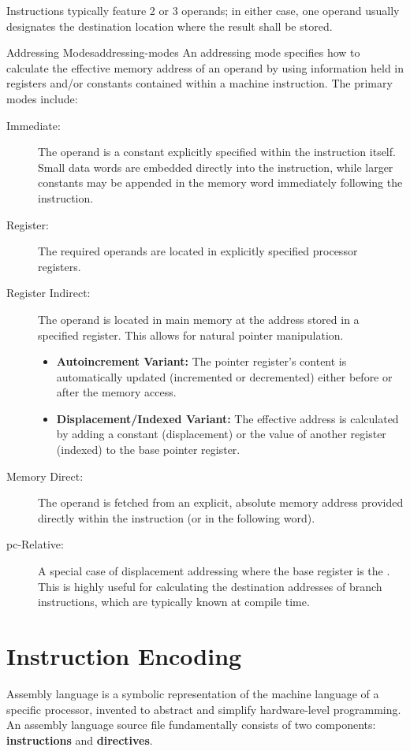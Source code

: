 \noindent Instructions typically feature 2 or 3 operands; in either case, one operand usually designates the destination location where the result shall be stored.

\begin{definition}{Addressing Modes}{addressing-modes}
    An addressing mode specifies how to calculate the effective memory address of an operand by using information held in registers and/or constants contained within a machine instruction. The primary modes include:
    \begin{description}
        \item[Immediate:] The operand is a constant explicitly specified within the instruction itself. Small data words are embedded directly into the instruction, while larger constants may be appended in the memory word immediately following the instruction.
        \item[Register:] The required operands are located in explicitly specified processor registers.
        \item[Register Indirect:] The operand is located in main memory at the address stored in a specified register. This allows for natural pointer manipulation.
        \begin{itemize}
            \item \textbf{Autoincrement Variant:} The pointer register's content is automatically updated (incremented or decremented) either before or after the memory access.
            \item \textbf{Displacement/Indexed Variant:} The effective address is calculated by adding a constant (displacement) or the value of another register (indexed) to the base pointer register.
        \end{itemize}
        \item[Memory Direct:] The operand is fetched from an explicit, absolute memory address provided directly within the instruction (or in the following word).
        \item[\gls{pc}-Relative:] A special case of displacement addressing where the base register is the . This is highly useful for calculating the destination addresses of branch instructions, which are typically known at compile time.
    \end{description}
\end{definition}

\section{Instruction Encoding}
Assembly language is a symbolic representation of the machine language of a specific processor, invented to abstract and simplify hardware-level programming. An assembly language source file fundamentally consists of two components: \textbf{instructions} and \textbf{directives}. 

